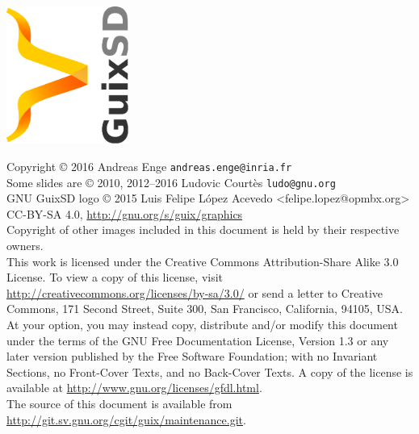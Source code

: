 \documentclass [t]{beamer}
\begin{document}
\begin {frame}
\centerline {\includegraphics[width=0.3\textwidth,angle=270]{images/guixsd.pdf}}

\vfill
    \tiny{
      Copyright \copyright{} 2016 Andreas Enge \texttt{andreas.enge@inria.fr}\\
      Some slides are \copyright{} 2010, 2012--2016 Ludovic Courtès \texttt{ludo@gnu.org}\\[2mm]

      GNU GuixSD logo \copyright{} 2015 Luis Felipe López Acevedo <felipe.lopez@opmbx.org>\\
      CC-BY-SA 4.0, \url{http://gnu.org/s/guix/graphics}\\[2mm]

      Copyright of other images included in this document is held by
      their respective owners.
      \\[2mm]
      This work is licensed under the \alert{Creative Commons
        Attribution-Share Alike 3.0} License.  To view a copy of this
      license, visit
      \url{http://creativecommons.org/licenses/by-sa/3.0/} or send a
      letter to Creative Commons, 171 Second Street, Suite 300, San
      Francisco, California, 94105, USA.
      \\[2.0mm]
      At your option, you may instead copy, distribute and/or modify
      this document under the terms of the \alert{GNU Free Documentation
        License, Version 1.3 or any later version} published by the Free
      Software Foundation; with no Invariant Sections, no Front-Cover
      Texts, and no Back-Cover Texts.  A copy of the license is
      available at \url{http://www.gnu.org/licenses/gfdl.html}.
      \\[2.0mm]
      The source of this document is available from
      \url{http://git.sv.gnu.org/cgit/guix/maintenance.git}.
    }
\end {frame}
\end{document}
